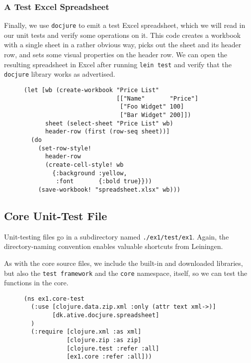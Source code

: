 \documentclass[11pt]{article}
\begin{document}
\subsubsection{A Test Excel Spreadsheet}
\label{sec-2-3-3}
Finally, we use \verb|docjure| to emit a test Excel spreadsheet, which
we will read in our unit tests and verify some operations on it. This
code creates a workbook with a single sheet in a rather obvious way,
picks out the sheet and its header row, and sets some visual
properties on the header row. We can open the resulting spreadsheet in
Excel after running \verb|lein test| and verify that the
\verb|docjure| library works as advertised.
\begin{figure}[H]
\label{docjure-test-spreadsheet}
\begin{verbatim}
(let [wb (create-workbook "Price List"
                          [["Name"       "Price"]
                           ["Foo Widget" 100]
                           ["Bar Widget" 200]])
      sheet (select-sheet "Price List" wb)
      header-row (first (row-seq sheet))]
  (do
    (set-row-style!
      header-row
      (create-cell-style! wb
        {:background :yellow,
         :font       {:bold true}}))
    (save-workbook! "spreadsheet.xlsx" wb)))
\end{verbatim}
\end{figure}
\subsection{Core Unit-Test File}
\label{sec-2-4}
Unit-testing files go in a subdirectory named \verb+./ex1/test/ex1+.
Again, the directory-naming convention enables valuable shortcuts
from Leiningen.

As with the core source files, we include the built-in and downloaded
libraries, but also the \verb|test framework| and the \verb|core|
namespace, itself, so we can test the functions in the core.
\begin{figure}[H]
\label{main-test-namespace}
\begin{verbatim}
(ns ex1.core-test
  (:use [clojure.data.zip.xml :only (attr text xml->)]
        [dk.ative.docjure.spreadsheet]
  )
  (:require [clojure.xml :as xml]
            [clojure.zip :as zip]
            [clojure.test :refer :all]
            [ex1.core :refer :all]))
\end{verbatim}
\end{figure}
\end{document}

